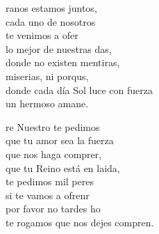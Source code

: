 \begin{cancion}%
	ranos estamos juntos,\\
cada uno de nosotros \\
	te venimos a ofer\\
	lo mejor de nuestras das,\\
donde no existen mentiras, \\
	miserias, ni porqus,\\
	donde cada día Sol luce con fuerza\\
	un hermoso amane.\\
	\begin{chorus}%
	re Nuestro te pedimos\\
que tu amor sea la fuerza\\
	que nos haga comprer,\\
	que tu Reino está en laida,\\
	te pedimos mil peres\\
	si te vamos a ofrenr\\
	por favor no tardes ho \\
	te rogamos que nos dejes compren.\\
	\end{chorus}%
\end{cancion}%
